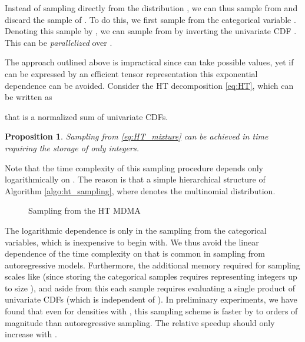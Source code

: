 \documentclass{article}
\newtheorem{proposition}{Proposition}
\begin{document}
Instead of sampling directly from the distribution , we can thus sample from  and discard the sample of .
To do this, we first sample from the categorical variable . Denoting this sample by , we can sample from  by inverting the univariate CDF .
This can be \textit{parallelized} over . 

The approach outlined above is impractical since  can take  possible values, yet if  can be expressed by an efficient tensor representation this exponential dependence can be avoided. 
Consider the HT decomposition \cref{eq:HT}, which can be written as 

that is a normalized sum of  univariate CDFs. 
\begin{proposition}\label{prop:HT_sampling}
Sampling from \eqref{eq:HT_mixture} can be achieved in  time requiring the storage of only  integers.
\end{proposition}
Note that the time complexity of this sampling procedure depends only logarithmically on .
The reason is that a simple hierarchical structure of Algorithm \ref{algo:ht_sampling}, where  denotes the multinomial distribution.
\begin{figure}[ht]
\vspace{-.2in}
  \centering
  \begin{minipage}{.7\linewidth}
  \begin{algorithm}[H]
    \SetAlgoLined
    \;
     \For{ \KwTo  \KwBy }{
      \;
     }
     \;
     \caption{Sampling from the HT MDMA}\label{algo:ht_sampling}
    \end{algorithm}
    \end{minipage}
    \vspace{-.2in}
    \label{alg:HT}
\end{figure}


The logarithmic dependence is only in the sampling from the categorical variables, which is inexpensive to begin with.
We thus avoid the linear dependence of the time complexity on  that is common in sampling from autoregressive models. Furthermore, the additional memory required for sampling scales like  (since storing the categorical samples requires representing integers up to size ), and aside from this each sample requires evaluating a single product of univariate CDFs (which is independent of ). In preliminary experiments, we have found that even for densities with , this sampling scheme is faster by  to  orders of magnitude than autoregressive sampling. The relative speedup should only increase with . 
\end{document}
